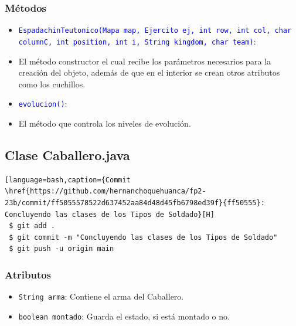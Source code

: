 \documentclass{article}
\begin{document}
\subsubsection{Métodos}
\begin{itemize}
    \item \texttt{\textcolor{blue}{EspadachinTeutonico(Mapa map, Ejercito ej, int row, int col, char columnC, int position, int i, String kingdom, char team)}}: 
    \item El método constructor el cual recibe los parámetros necesarios para la creación del objeto, además de que en el interior se crean otros atributos como los cuchillos.
\end{itemize}

\begin{itemize}
    \item \texttt{\textcolor{blue}{evolucion()}}: 
    \item El método que controla los niveles de evolución. 
\end{itemize}



\subsection{Clase Caballero.java}
\begin{lstlisting}[language=bash,caption={Commit \href{https://github.com/hernanchoquehuanca/fp2-23b/commit/ff5055578522d637452aa84d48d45fb6798ed39f}{ff50555}: Concluyendo las clases de los Tipos de Soldado}[H]
 $ git add .
 $ git commit -m "Concluyendo las clases de los Tipos de Soldado"			
 $ git push -u origin main
\end{lstlisting}

\subsubsection{Atributos}
\begin{itemize}
    \item \texttt{String arma}: Contiene el arma del Caballero.
    \item \texttt{boolean montado}: Guarda el estado, si está montado o no.
\end{itemize}

\end{document}
